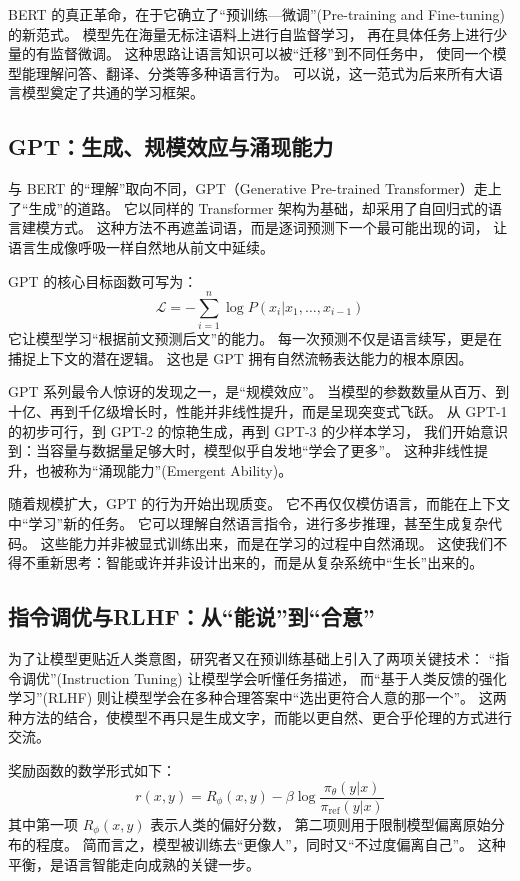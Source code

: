 BERT 的真正革命，在于它确立了“预训练—微调”(Pre-training and Fine-tuning) 的新范式。  
模型先在海量无标注语料上进行自监督学习，  
再在具体任务上进行少量的有监督微调。  
这种思路让语言知识可以被“迁移”到不同任务中，  
使同一个模型能理解问答、翻译、分类等多种语言行为。  
可以说，这一范式为后来所有大语言模型奠定了共通的学习框架。  

\subsection{GPT：生成、规模效应与涌现能力}

与 BERT 的“理解”取向不同，GPT（Generative Pre-trained Transformer）走上了“生成”的道路。  
它以同样的 Transformer 架构为基础，却采用了自回归式的语言建模方式。  
这种方法不再遮盖词语，而是逐词预测下一个最可能出现的词，  
让语言生成像呼吸一样自然地从前文中延续。  

GPT 的核心目标函数可写为：  
\[
\mathcal{L} = -\sum_{i=1}^n \log P(x_i | x_1, \ldots, x_{i-1})
\]  
它让模型学习“根据前文预测后文”的能力。  
每一次预测不仅是语言续写，更是在捕捉上下文的潜在逻辑。  
这也是 GPT 拥有自然流畅表达能力的根本原因。  

GPT 系列最令人惊讶的发现之一，是“规模效应”。  
当模型的参数数量从百万、到十亿、再到千亿级增长时，性能并非线性提升，而是呈现突变式飞跃。  
从 GPT-1 的初步可行，到 GPT-2 的惊艳生成，再到 GPT-3 的少样本学习，  
我们开始意识到：当容量与数据量足够大时，模型似乎自发地“学会了更多”。  
这种非线性提升，也被称为“涌现能力”(Emergent Ability)。  

随着规模扩大，GPT 的行为开始出现质变。  
它不再仅仅模仿语言，而能在上下文中“学习”新的任务。  
它可以理解自然语言指令，进行多步推理，甚至生成复杂代码。  
这些能力并非被显式训练出来，而是在学习的过程中自然涌现。  
这使我们不得不重新思考：智能或许并非设计出来的，而是从复杂系统中“生长”出来的。  

\subsection{指令调优与RLHF：从“能说”到“合意”}

为了让模型更贴近人类意图，研究者又在预训练基础上引入了两项关键技术：  
“指令调优”(Instruction Tuning) 让模型学会听懂任务描述，  
而“基于人类反馈的强化学习”(RLHF) 则让模型学会在多种合理答案中“选出更符合人意的那一个”。  
这两种方法的结合，使模型不再只是生成文字，而能以更自然、更合乎伦理的方式进行交流。  

奖励函数的数学形式如下：  
\[
r(x, y) = R_\phi(x, y) - \beta \log \frac{\pi_\theta(y|x)}{\pi_{\text{ref}}(y|x)}
\]  
其中第一项 $R_\phi(x, y)$ 表示人类的偏好分数，  
第二项则用于限制模型偏离原始分布的程度。  
简而言之，模型被训练去“更像人”，同时又“不过度偏离自己”。  
这种平衡，是语言智能走向成熟的关键一步。  


